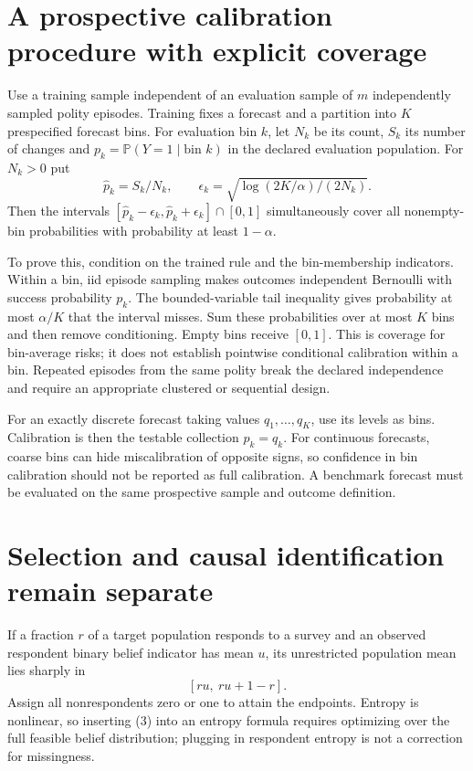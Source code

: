 \documentclass[11pt,a4paper]{article}
\newcommand{\Prob}{\mathbb P}
\begin{document}
\section{A prospective calibration procedure with explicit coverage}
Use a training sample independent of an evaluation sample of $m$ independently sampled polity episodes. Training fixes a forecast and a partition into $K$ prespecified forecast bins. For evaluation bin $k$, let $N_k$ be its count, $S_k$ its number of changes and $p_k=\Prob(Y=1\mid\text{bin }k)$ in the declared evaluation population. For $N_k>0$ put
\[
 \widehat p_k=S_k/N_k,\qquad
 \epsilon_k=\sqrt{\log(2K/\alpha)/(2N_k)}.
\]
Then the intervals $[\widehat p_k-\epsilon_k,\widehat p_k+\epsilon_k]\cap[0,1]$ simultaneously cover all nonempty-bin probabilities with probability at least $1-\alpha$.

To prove this, condition on the trained rule and the bin-membership indicators. Within a bin, iid episode sampling makes outcomes independent Bernoulli with success probability $p_k$. The bounded-variable tail inequality gives probability at most $\alpha/K$ that the interval misses. Sum these probabilities over at most $K$ bins and then remove conditioning. Empty bins receive $[0,1]$. This is coverage for bin-average risks; it does not establish pointwise conditional calibration within a bin. Repeated episodes from the same polity break the declared independence and require an appropriate clustered or sequential design.

For an exactly discrete forecast taking values $q_1,\ldots,q_K$, use its levels as bins. Calibration is then the testable collection $p_k=q_k$. For continuous forecasts, coarse bins can hide miscalibration of opposite signs, so confidence in bin calibration should not be reported as full calibration. A benchmark forecast must be evaluated on the same prospective sample and outcome definition.

\section{Selection and causal identification remain separate}
If a fraction $r$ of a target population responds to a survey and an observed respondent binary belief indicator has mean $u$, its unrestricted population mean lies sharply in
\[
 [ru,\ ru+1-r].                                           \tag{3}
\]
Assign all nonrespondents zero or one to attain the endpoints. Entropy is nonlinear, so inserting (3) into an entropy formula requires optimizing over the full feasible belief distribution; plugging in respondent entropy is not a correction for missingness.
\end{document}
